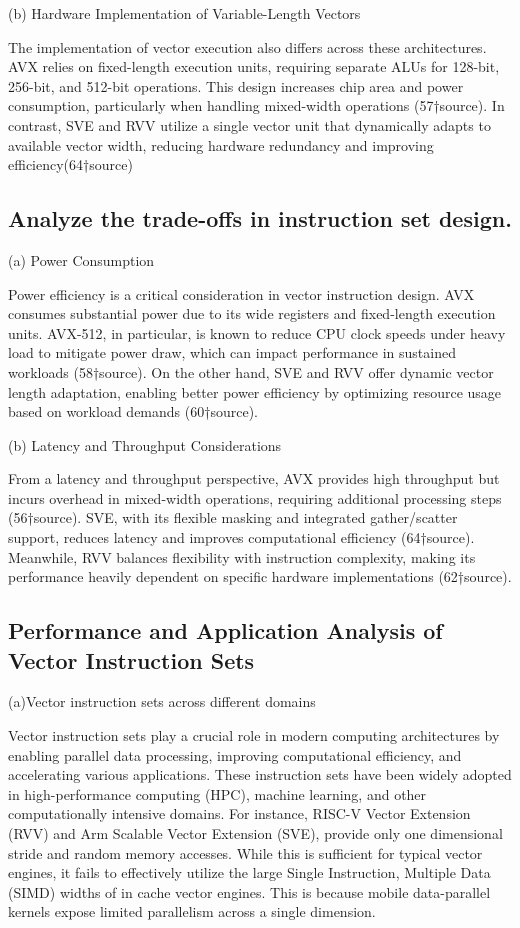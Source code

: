 \documentclass[conference]{IEEEtran}
\begin{document}
(b) Hardware Implementation of Variable-Length Vectors

The implementation of vector execution also differs across these architectures. AVX relies on fixed-length execution units, requiring separate ALUs for 128-bit, 256-bit, and 512-bit operations. This design increases chip area and power consumption, particularly when handling mixed-width operations (57†source). In contrast, SVE and RVV utilize a single vector unit that dynamically adapts to available vector width, reducing hardware redundancy and improving efficiency(64†source)

\subsection{ Analyze the trade-offs in instruction set design.}
(a) Power Consumption

Power efficiency is a critical consideration in vector instruction design. AVX consumes substantial power due to its wide registers and fixed-length execution units. AVX-512, in particular, is known to reduce CPU clock speeds under heavy load to mitigate power draw, which can impact performance in sustained workloads (58†source). On the other hand, SVE and RVV offer dynamic vector length adaptation, enabling better power efficiency by optimizing resource usage based on workload demands (60†source).

(b) Latency and Throughput Considerations

From a latency and throughput perspective, AVX provides high throughput but incurs overhead in mixed-width operations, requiring additional processing steps (56†source). SVE, with its flexible masking and integrated gather/scatter support, reduces latency and improves computational efficiency (64†source). Meanwhile, RVV balances flexibility with instruction complexity, making its performance heavily dependent on specific hardware implementations (62†source).


\subsection{Performance and Application Analysis of Vector Instruction Sets}

(a)Vector instruction sets across different domains

Vector instruction sets play a crucial role in modern computing architectures by enabling parallel data processing, improving computational efficiency, and accelerating various applications. These instruction sets have been widely adopted in high-performance computing (HPC), machine learning, and other computationally intensive domains. For instance, RISC-V Vector Extension (RVV) and Arm Scalable Vector Extension (SVE), provide only one dimensional stride and random memory accesses. While this is sufficient for typical vector engines, it fails to effectively utilize the large Single Instruction, Multiple Data (SIMD) widths of in cache vector engines. This is because mobile data-parallel kernels expose limited parallelism across a single dimension.
\end{document}
